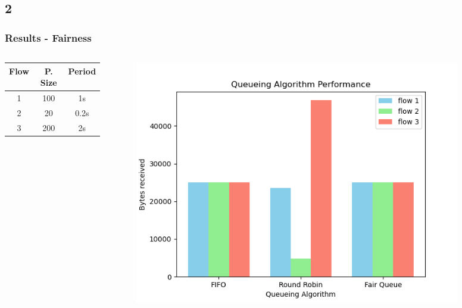 \documentclass[compress]{beamer}
\begin{document}
    \subsection{2}
    \begin{frame}
        \frametitle{Results - Fairness}
        \begin{columns}
            \begin{column}{0.3\textwidth}
                \begin{tabular}{|c|c|c|}
                    \hline
                    Flow & P. Size & Period \\
                    \hline
                    1    & 100     & 1s     \\
                    2    & 20      & 0.2s   \\
                    3    & 200     & 2s     \\
                    \hline
                \end{tabular}
            \end{column}

            \begin{column}{0.7\textwidth}
                \begin{figure}
                    \centering
                    \includegraphics[width=0.9\textwidth]{img/fairness_bar}
                \end{figure}
            \end{column}
        \end{columns}
    \end{frame}
\end{document}
